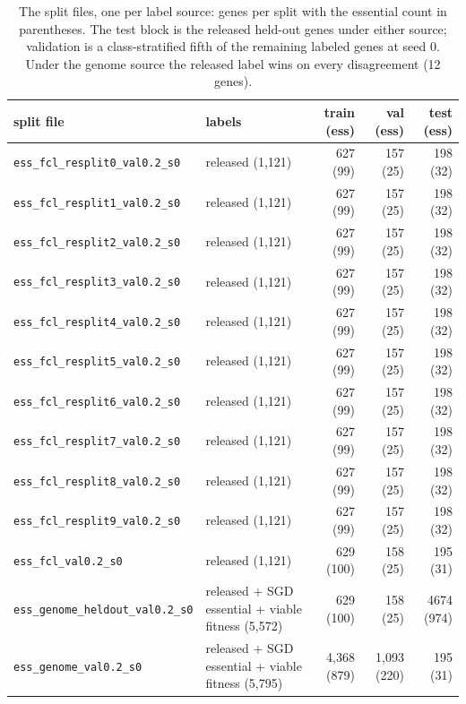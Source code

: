 \begin{table}[H]
  \centering
  \footnotesize
  \caption[Split files]{The split files, one per label source: genes per split with the essential count in parentheses. The test block is the released held-out genes under either source; validation is a class-stratified fifth of the remaining labeled genes at seed 0. Under the genome source the released label wins on every disagreement (12 genes).}
  \label{tab:splits}
  \begin{tabular}{@{}llrrr@{}}
    \hline
    split file & labels & train (ess) & val (ess) & test (ess) \\
    \hline
    \texttt{ess\_fcl\_resplit0\_val0.2\_s0} & released (1,121) & 627 (99) & 157 (25) & 198 (32) \\
    \texttt{ess\_fcl\_resplit1\_val0.2\_s0} & released (1,121) & 627 (99) & 157 (25) & 198 (32) \\
    \texttt{ess\_fcl\_resplit2\_val0.2\_s0} & released (1,121) & 627 (99) & 157 (25) & 198 (32) \\
    \texttt{ess\_fcl\_resplit3\_val0.2\_s0} & released (1,121) & 627 (99) & 157 (25) & 198 (32) \\
    \texttt{ess\_fcl\_resplit4\_val0.2\_s0} & released (1,121) & 627 (99) & 157 (25) & 198 (32) \\
    \texttt{ess\_fcl\_resplit5\_val0.2\_s0} & released (1,121) & 627 (99) & 157 (25) & 198 (32) \\
    \texttt{ess\_fcl\_resplit6\_val0.2\_s0} & released (1,121) & 627 (99) & 157 (25) & 198 (32) \\
    \texttt{ess\_fcl\_resplit7\_val0.2\_s0} & released (1,121) & 627 (99) & 157 (25) & 198 (32) \\
    \texttt{ess\_fcl\_resplit8\_val0.2\_s0} & released (1,121) & 627 (99) & 157 (25) & 198 (32) \\
    \texttt{ess\_fcl\_resplit9\_val0.2\_s0} & released (1,121) & 627 (99) & 157 (25) & 198 (32) \\
    \texttt{ess\_fcl\_val0.2\_s0} & released (1,121) & 629 (100) & 158 (25) & 195 (31) \\
    \texttt{ess\_genome\_heldout\_val0.2\_s0} & released + SGD essential + viable fitness (5,572) & 629 (100) & 158 (25) & 4674 (974) \\
    \texttt{ess\_genome\_val0.2\_s0} & released + SGD essential + viable fitness (5,795) & 4,368 (879) & 1,093 (220) & 195 (31) \\
    \hline
  \end{tabular}
\end{table}
